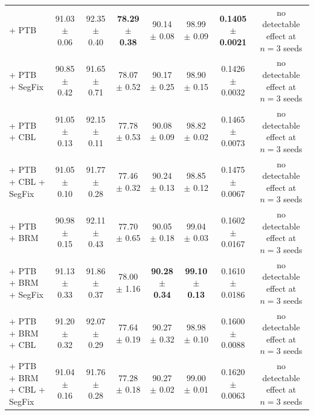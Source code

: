 \begin{tabular}{lccccccc}
+ PTB & 91.03 $\pm$ 0.06 & 92.35 $\pm$ 0.40 & \textbf{78.29 $\pm$ 0.38} & 90.14 $\pm$ 0.08 & 98.99 $\pm$ 0.09 & \textbf{0.1405 $\pm$ 0.0021} & no detectable effect at $n{=}3$ seeds \\
+ PTB + SegFix & 90.85 $\pm$ 0.42 & 91.65 $\pm$ 0.71 & 78.07 $\pm$ 0.52 & 90.17 $\pm$ 0.25 & 98.90 $\pm$ 0.15 & 0.1426 $\pm$ 0.0032 & no detectable effect at $n{=}3$ seeds \\
+ PTB + CBL & 91.05 $\pm$ 0.13 & 92.15 $\pm$ 0.11 & 77.78 $\pm$ 0.53 & 90.08 $\pm$ 0.09 & 98.82 $\pm$ 0.02 & 0.1465 $\pm$ 0.0073 & no detectable effect at $n{=}3$ seeds \\
+ PTB + CBL + SegFix & 91.05 $\pm$ 0.10 & 91.77 $\pm$ 0.28 & 77.46 $\pm$ 0.32 & 90.24 $\pm$ 0.13 & 98.85 $\pm$ 0.12 & 0.1475 $\pm$ 0.0067 & no detectable effect at $n{=}3$ seeds \\
+ PTB + BRM & 90.98 $\pm$ 0.15 & 92.11 $\pm$ 0.43 & 77.70 $\pm$ 0.65 & 90.05 $\pm$ 0.18 & 99.04 $\pm$ 0.03 & 0.1602 $\pm$ 0.0167 & no detectable effect at $n{=}3$ seeds \\
+ PTB + BRM + SegFix & 91.13 $\pm$ 0.33 & 91.86 $\pm$ 0.37 & 78.00 $\pm$ 1.16 & \textbf{90.28 $\pm$ 0.34} & \textbf{99.10 $\pm$ 0.13} & 0.1610 $\pm$ 0.0186 & no detectable effect at $n{=}3$ seeds \\
+ PTB + BRM + CBL & 91.20 $\pm$ 0.32 & 92.07 $\pm$ 0.29 & 77.64 $\pm$ 0.19 & 90.27 $\pm$ 0.32 & 98.98 $\pm$ 0.10 & 0.1600 $\pm$ 0.0088 & no detectable effect at $n{=}3$ seeds \\
+ PTB + BRM + CBL + SegFix & 91.04 $\pm$ 0.16 & 91.76 $\pm$ 0.28 & 77.28 $\pm$ 0.18 & 90.27 $\pm$ 0.02 & 99.00 $\pm$ 0.01 & 0.1620 $\pm$ 0.0063 & no detectable effect at $n{=}3$ seeds \\
\bottomrule
\end{tabular}
